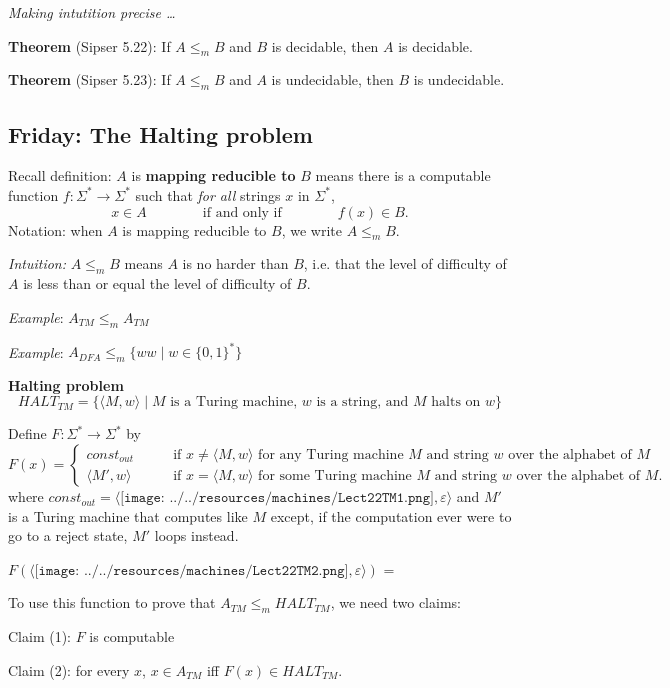 \documentclass[12pt, oneside]{article}
\begin{document}
{\it Making intutition precise \ldots}

{\bf Theorem} (Sipser 5.22): If $A \leq_m B$ and $B$ is decidable, then $A$ is decidable.
    
\vfill


{\bf Theorem} (Sipser 5.23): If $A \leq_m B$ and $A$ is undecidable, then $B$ is undecidable.
    
\vfill
 

\newpage
\subsection*{Friday: The Halting problem}




Recall definition:  $A$ is  {\bf  mapping  reducible to} $B$  means there is a computable function 
$f : \Sigma^* \to \Sigma^*$ such that {\it for all} strings  $x$ in $\Sigma^*$, 
\[
x  \in  A \qquad \qquad \text{if and  only  if} \qquad \qquad f(x) \in B.
\]
Notation:  when $A$  is mapping reducible to $B$, we write $A  \leq_m B$.

{\it Intuition:} $A \leq_m B$ means $A$ is no harder than $B$, i.e. that the level 
of difficulty of $A$ is less than or equal the level of difficulty of $B$.


{\it Example}: $A_{TM} \leq_m A_{TM}$ 

\vfill

{\it Example}: $A_{DFA} \leq_m \{ ww \mid  w \in \{0,1\}^* \}$ 

\vfill






\newpage

    {\bf Halting problem}
    \[
    HALT_{TM} = \{ \langle M, w \rangle \mid \text{$M$ is a  Turing machine, $w$ is  a string, and $M$ halts on $w$} \}
    \]
    
    Define $F: \Sigma^* \to \Sigma^*$ by
    \[
    F(x) =  \begin{cases}
    const_{out} \qquad &\text{if  $x \neq \langle M,w \rangle$ for any Turing machine  $M$ and string  $w$ over the alphabet of $M$} \\
    \langle M', w \rangle \qquad &  \text{if $x = \langle M, w \rangle$ for some Turing machine  $M$ and string $w$ over the alphabet of $M$.}
    \end{cases}
    \]
    where $const_{out}  =  \langle  \texttt{[image: ../../resources/machines/Lect22TM1.png]} ,  \varepsilon  \rangle$
    and  $M'$ is a Turing machine that computes like $M$ except, if the computation ever were to go to a  reject state,
    $M'$ loops instead.   


    $F( \langle \texttt{[image: ../../resources/machines/Lect22TM2.png]} ,  \varepsilon  \rangle)$ =

    To use this function  to prove that $A_{TM} \leq_m HALT_{TM}$, we need  two claims:

    
    Claim (1): $F$ is computable \phantom{\hspace{2in}}
    
    \vfill

    Claim (2): for every  $x$,  $x \in  A_{TM}$ iff $F(x) \in HALT_{TM}$.  
    
    \vfill
    \vfill
    \vfill 
\end{document}
